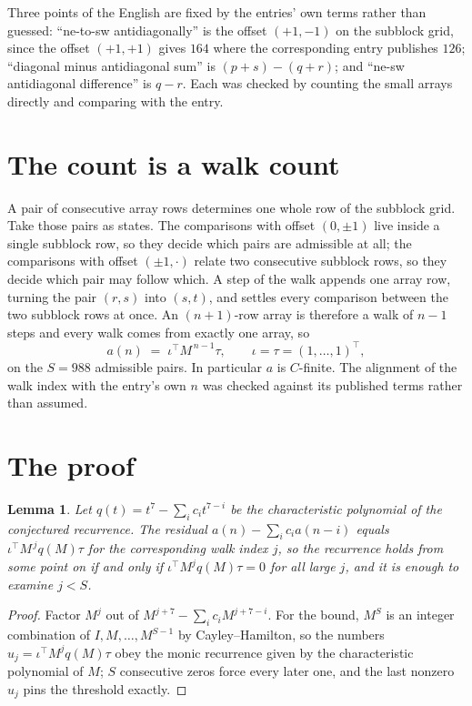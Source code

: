 \documentclass[11pt,a4paper]{article}
\theoremstyle{plain}
\newtheorem{lemma}[theorem]{Lemma}
\theoremstyle{definition}
\begin{document}
Three points of the English are fixed by the entries' own terms rather than guessed:
``ne-to-sw antidiagonally'' is the offset $(+1,-1)$ on the subblock grid, since the offset
$(+1,+1)$ gives $164$ where the corresponding entry publishes $126$; ``diagonal minus
antidiagonal sum'' is $(p+s)-(q+r)$; and ``ne-sw antidiagonal difference'' is $q-r$. Each was
checked by counting the small arrays directly and comparing with the entry.

\section{The count is a walk count}

A pair of consecutive array rows determines one whole row of the subblock grid. Take those
pairs as states. The comparisons with offset $(0,\pm1)$ live inside a single subblock row, so
they decide which pairs are admissible at all; the comparisons with offset $(\pm1,\cdot)$
relate two consecutive subblock rows, so they decide which pair may follow which. A step of the
walk appends one array row, turning the pair $(r,s)$ into $(s,t)$, and settles every comparison
between the two subblock rows at once. An $(n+1)$-row array is therefore a walk of $n-1$ steps
and every walk comes from exactly one array, so
\[
a(n)\;=\;\iota^{\!\top}M^{\,n-1}\tau,\qquad \iota=\tau=(1,\dots,1)^{\!\top},
\]
on the $S=988$ admissible pairs. In particular $a$ is $C$-finite. The alignment of the walk
index with the entry's own $n$ was checked against its published terms rather than assumed.

\section{The proof}

\begin{lemma}\label{lem:crit}
Let $q(t)=t^{7}-\sum_i c_it^{7-i}$ be the characteristic polynomial of the
conjectured recurrence. The residual $a(n)-\sum_ic_ia(n-i)$ equals
$\iota^{\!\top}M^{\,j}q(M)\tau$ for the corresponding walk index $j$, so the recurrence
holds from some point on if and only if $\iota^{\!\top}M^{j}q(M)\tau=0$ for all large $j$,
and it is enough to examine $j<S$.
\end{lemma}

\begin{proof}
Factor $M^{j}$ out of $M^{j+7}-\sum_ic_iM^{j+7-i}$. For the bound, $M^{S}$
is an integer combination of $I,M,\dots,M^{S-1}$ by Cayley--Hamilton, so the numbers
$u_j=\iota^{\!\top}M^{j}q(M)\tau$ obey the monic recurrence given by the characteristic
polynomial of $M$; $S$ consecutive zeros force every later one, and the last nonzero $u_j$
pins the threshold exactly.
\end{proof}
\end{document}
